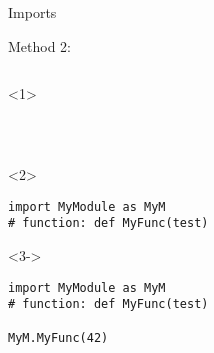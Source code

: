 \begin{frame}[fragile]{Imports}

  Method 2: 

  \begin{columns}[onlytextwidth]
    \begin{column}{\textwidth}

      \begin{onlyenv}<1>
        \begin{lstlisting}[style=python]



 \end{lstlisting}
      \end{onlyenv}

      \begin{onlyenv}<2>
        \begin{lstlisting}[style=python]
import MyModule as MyM
# function: def MyFunc(test)

 \end{lstlisting}
      \end{onlyenv}

      \begin{onlyenv}<3->
        \begin{lstlisting}[style=python]
import MyModule as MyM
# function: def MyFunc(test)

MyM.MyFunc(42) \end{lstlisting}
      \end{onlyenv}

    \end{column}
  \end{columns}

\end{frame}


